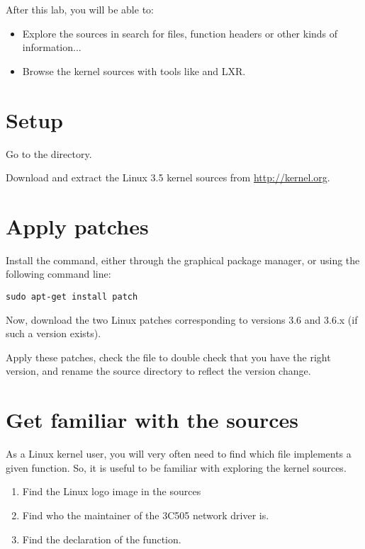 
After this lab, you will be able to:

\begin{itemize}

\item Explore the sources in search for files, function headers or
  other kinds of information...

\item Browse the kernel sources with tools like  and LXR.

\end{itemize}

\section{Setup}

Go to the  directory.

Download and extract the Linux 3.5 kernel sources
from \url{http://kernel.org}.

\section{Apply patches}

Install the  command, either through the graphical package
manager, or using the following command line:

\begin{verbatim}
sudo apt-get install patch
\end{verbatim}

Now, download the two Linux patches corresponding to versions 3.6 and
3.6.x (if such a version exists).

Apply these patches, check the  file to double check
that you have the right version, and rename the source directory to
reflect the version change.

\section{Get familiar with the sources}

As a Linux kernel user, you will very often need to find which file
implements a given function. So, it is useful to be familiar with
exploring the kernel sources.

\begin{enumerate}
\item Find the Linux logo image in the sources
\item Find who the maintainer of the 3C505 network driver is.
\item Find the declaration of the  function.
\end{enumerate}


